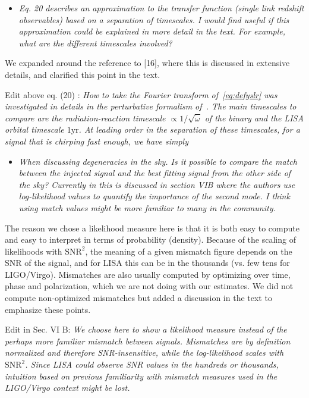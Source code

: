 \documentclass[11pt]{letter}
\begin{document}
\begin{itemize}
	\item {\it Eq. 20 describes an approximation to the transfer function
(single link redshift observables) based on a separation of
timescales. I would find useful if this approximation could
be explained in more detail in the text. For example,
what are the different timescales involved?}
\end{itemize}

We expanded around the reference to [16], where this is discussed in extensive details, and clarified this point in the text.

Edit above eq. (20) : {\it How to take the Fourier transform of~\eqref{eq:defyslr} was investigated in details in the perturbative formalism of~\cite{MB18}. The main timescales to compare are the radiation-reaction timescale $\propto 1/\sqrt{\dot{\omega}}$ of the binary and the LISA orbital timescale $1\mathrm{yr}$. At  leading order in the separation of these timescales, for a signal that is chirping fast enough, we have simply}

\begin{itemize}
	\item {\it When discussing degeneracies in the sky. Is it possible to
compare the match between the injected signal and the best
fitting signal from the other side of the sky? Currently in
this is discussed in section VIB where the authors use
log-likelihood values to quantify the importance of the second
mode. I think using match values might be more familiar to
many in the community.}
\end{itemize}

The reason we chose a likelihood measure here is that it is both easy to compute and easy to interpret in terms of probability (density). Because of the scaling of likelihoods with $\mathrm{SNR}^{2}$, the meaning of a given mismatch figure depends on the SNR of the signal, and for LISA this can be in the thousands (vs. few tens for LIGO/Virgo). Mismatches are also usually computed by optimizing over time, phase and polarization, which we are not doing with our estimates. We did not compute non-optimized mismatches but added a discussion in the text to emphasize these points.

Edit in Sec. VI B: {\it We choose here to show a likelihood measure instead of the perhaps more familiar mismatch between signals. Mismatches are by definition normalized and therefore SNR-insensitive, while the log-likelihood scales with $\mathrm{SNR}^{2}$. Since LISA could observe SNR values in the hundreds or thousands, intuition based on previous familiarity with mismatch measures used in the LIGO/Virgo context might be lost.}
\end{document}

